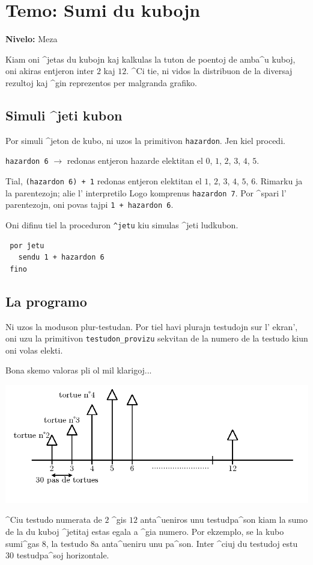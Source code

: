 \chapter{Temo: Sumi du kubojn}
{ }\hfill\textbf{Nivelo:} Meza

Kiam oni ^jetas du kubojn kaj kalkulas la tuton de poentoj de amba^u
kuboj, oni akiras entjeron inter $2$ kaj $12$.  ^Ci tie, ni vidos la
distribuon de la diversaj rezultoj kaj ^gin reprezentos per malgranda
grafiko.

\section{Simuli ^jeti kubon}
Por simuli ^jeton de kubo, ni uzos la primitivon \texttt{hazardon}.  Jen kiel procedi.

\texttt{hazardon 6} $\longrightarrow$ redonas entjeron hazarde
elektitan el $0$, $1$, $2$, $3$, $4$, $5$.

Tial, \texttt{(hazardon 6) + 1} redonas entjeron elektitan el $1$,
$2$, $3$, $4$, $5$, $6$.  Rimarku ja la parentezojn; alie l'
interpretilo Logo komprenus \texttt{hazardon 7}.  Por ^spari l'
parentezojn, oni povas tajpi \texttt{1 + hazardon 6}.

Oni difinu tiel la proceduron \texttt{^jetu} kiu simulas ^jeti
ludkubon.
\begin{verbatim}
 por ĵetu
   sendu 1 + hazardon 6
 fino
\end{verbatim}
 \section{La programo}
 Ni uzos la moduson plur-testudan.  Por tiel havi plurajn testudojn
 sur l' ekran', oni uzu la primitivon \texttt{testudon\_provizu}
 sekvitan de la numero de la testudo kiun oni volas elekti.

 Bona skemo valoras pli ol mil klarigoj...
\begin{center}
\includegraphics[scale=0.45]{bildoj/somme-des-schema.png}
\end{center}
\vspace{0.5cm} ^Ciu testudo numerata de $2$ ^gis $12$ anta^ueniros unu
testudpa^son kiam la sumo de la du kuboj ^jetitaj estas egala a ^gia
numero.  Por ekzemplo, se la kubo sumi^gas $8$, la testudo $8$a
anta^ueniru unu pa^son.  Inter ^ciuj du testudoj estu $30$
testudpa^soj horizontale.

